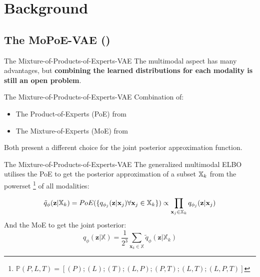     \section{Background}

    \subsection{The MoPoE-VAE (\cite{thomas_gener-ELBO})}
    \begin{frame}{The Mixture-of-Products-of-Experts-VAE}
        The multimodal aspect has many advantages, but \textbf{combining the learned distributions for each modality is still an open problem}.
    \end{frame}

    \begin{frame}{The Mixture-of-Products-of-Experts-VAE}
        Combination of:
        \begin{itemize}
            \item The Product-of-Experts (PoE) from \cite{wu2018multimodal}
            \item The Mixture-of-Experts (MoE) from \cite{shi2019variational}
        \end{itemize}
        \vspace{\baselineskip}
        Both present a different choice for the joint posterior approximation function.
    \end{frame}


    \begin{frame}{The Mixture-of-Products-of-Experts-VAE}
        The generalized multimodal ELBO utilises the PoE to get the posterior approximation of a subset $\mathbb{X}_k$ from the powerset \footnote{$\mathbb{P}(P,L,T)=[(P); (L); (T); (L,P); (P,T); (L,T); (L,P,T)]$} of all modalities:

        \begin{equation}
            \tilde{q}_{\phi}(\textbf{z}|\mathbb{X}_k)=PoE(\{q_{\phi_j}(\textbf{z}|\textbf{x}_j) \forall \textbf{x}_j \in \mathbb{X}_k\}) \propto \prod _{\textbf{x}_j \in \mathbb{X}_k}q_{\phi_j}(\textbf{z}|\textbf{x}_j)
        \end{equation}
        And the MoE to get the joint posterior:
        \begin{equation}
            q_{\phi}(\textbf{z}|\mathbb{X}) = \frac{1}{2^3} \sum _{\textbf{x}_k \in \mathbb{X}} \tilde{q}_{\phi} (\textbf{z}|\mathbb{X}_k)
        \end{equation}
    \end{frame}


